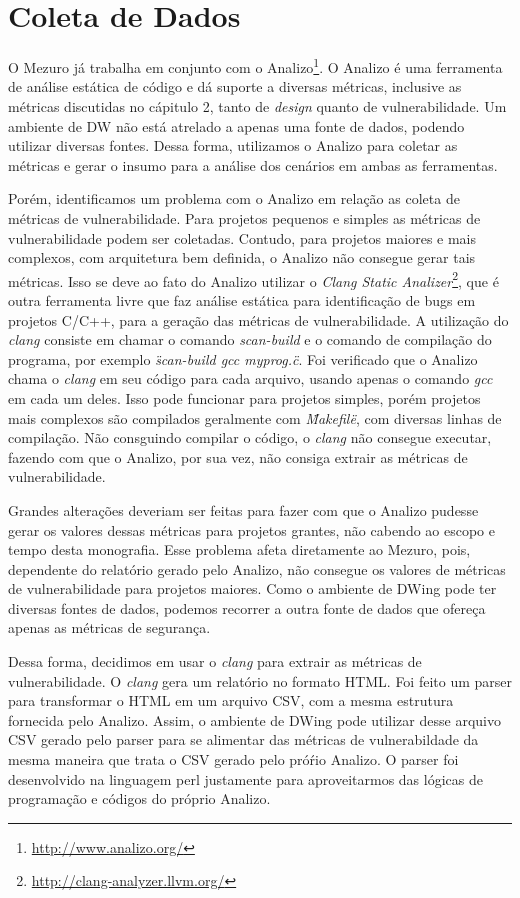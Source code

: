 \section{Coleta de Dados}
\label{data-colect}

O Mezuro já trabalha em conjunto com o Analizo\footnote{\url{http://www.analizo.org/}}. O Analizo é uma ferramenta de análise estática de código e dá suporte a diversas métricas, inclusive as métricas discutidas no cápitulo 2, tanto de \emph{design} quanto de vulnerabilidade. Um ambiente de DW não está atrelado a apenas uma fonte de dados, podendo utilizar diversas fontes. Dessa forma, utilizamos o Analizo para coletar as métricas e gerar o insumo para a análise dos cenários em ambas as ferramentas.

Porém, identificamos um problema com o Analizo em relação as coleta de métricas de vulnerabilidade. Para projetos pequenos e simples as métricas de vulnerabilidade podem ser coletadas.  Contudo, para projetos maiores e mais complexos, com arquitetura bem definida, o Analizo não consegue gerar tais métricas. Isso se deve ao fato do Analizo utilizar o \emph{Clang Static Analizer}\footnote{\url{http://clang-analyzer.llvm.org/}}, que é outra ferramenta livre que faz análise estática para identificação de bugs em projetos C/C++, para a geração das métricas de vulnerabilidade. A utilização do \emph{clang} consiste em chamar o comando \emph{scan-build}  e o comando de compilação do programa, por exemplo \emph{\"scan-build gcc myprog.c\"}. Foi verificado que o Analizo chama o \emph{clang} em seu código para cada arquivo, usando apenas o comando \emph{gcc} em cada um deles. Isso pode funcionar para projetos simples, porém projetos mais complexos são compilados geralmente com \emph{\"Makefile\"}, com diversas linhas de compilação. Não consguindo compilar o código, o \emph{clang} não consegue executar, fazendo com que o Analizo, por sua vez, não consiga extrair as métricas de vulnerabilidade. 

Grandes alterações deveriam ser feitas para fazer com que o Analizo pudesse gerar os valores dessas métricas para projetos grantes, não cabendo ao escopo e tempo desta monografia. Esse problema afeta diretamente ao Mezuro, pois, dependente do relatório gerado pelo Analizo, não consegue os valores de métricas de vulnerabilidade para projetos maiores. Como o ambiente de DWing pode ter diversas fontes de dados, podemos recorrer a outra fonte de dados que ofereça apenas as métricas de segurança.

Dessa forma, decidimos em usar o \emph{clang} para extrair as métricas de vulnerabilidade. O \emph{clang} gera um relatório no formato HTML. Foi feito um parser para transformar o HTML em um arquivo CSV, com a mesma estrutura fornecida pelo Analizo. Assim, o ambiente de DWing pode utilizar desse arquivo CSV gerado pelo parser para se alimentar das métricas de vulnerabildade da mesma maneira que trata o CSV gerado pelo próŕio Analizo. O parser foi desenvolvido na linguagem perl justamente para aproveitarmos das lógicas de programação e códigos do próprio Analizo.

